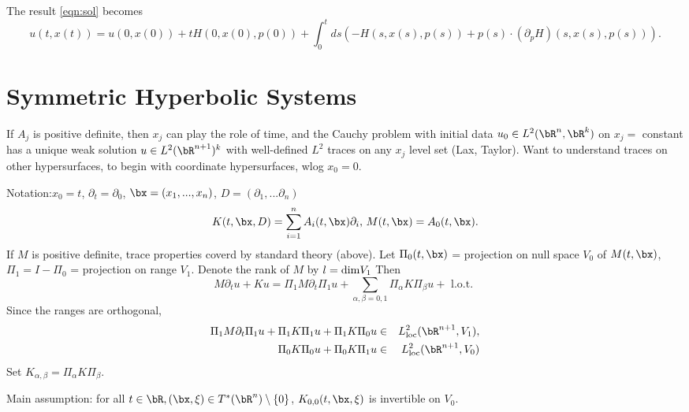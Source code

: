 The result \ref{eqn:sol} becomes
\begin{equation}
  \label{eqn:hsol}
  u(t,x(t))=u(0,x(0)) +tH(0,x(0),p(0))+ \int_0^t ds (-H(s,x(s),p(s)) + p(s)\cdot (\partial_p H)(s,x(s),p(s))).
\end{equation}

\section{Symmetric Hyperbolic Systems}

If $A_j$ is positive definite, then $x_j$ can play the role of time, and the Cauchy problem with initial data $u_0 \in L^2(\bR^n,\bR^k)$  on $x_j=$ constant has a unique weak solution $u \in L^2(\bR^{n+1})^k$ with well-defined $L^2$ traces on any $x_j$ level set (Lax, Taylor). Want to understand traces on other hypersurfaces, to begin with coordinate hypersurfaces, wlog $x_0=0$.

Notation:$x_0=t$, $\partial_t=\partial_0$, $\bx = (x_1,...,x_n)$, $D=(\partial_1,...\partial_n)$
\[
  K(t,\bx,D)= \sum_{i=1}^n A_i(t,\bx)\partial_i, \, M(t,\bx) = A_0(t,\bx).
\]
If $M$ is positive definite, trace properties coverd by standard theory (above). Let $\Pi_0(t,\bx)$ = projection on null space $V_0$ of $M(t,\bx)$, $\Pi_1=I-\Pi_0$ = projection on range $V_1$. Denote the rank of $M$ by $l={\rm dim} V_1$ Then
\[
  M\partial_t u + Ku = \Pi_1 M \partial_t \Pi_1 u + \sum_{\alpha,\beta=0,1} \Pi_{\alpha}K\Pi_{\beta}u + \mbox{ l.o.t. }
\]
Since the ranges are orthogonal,
\begin{eqnarray}
  \Pi_1 M \partial_t \Pi_1 u + \Pi_1 K \Pi_1 u + \Pi_1 K \Pi_0 u & \in & L^2_{\rm loc}(\bR^{n+1},V_1),
  \label{eqn:decomp1} \\
  \Pi_0 K \Pi_0 u + \Pi_0 K \Pi_1 u & \in & L^2_{\rm loc}(\bR^{n+1},V_0)
  \label{eqn:decomp0}
\end{eqnarray}
Set $K_{\alpha,\beta} = \Pi_{\alpha}K\Pi_{\beta}$.

Main assumption: for all $t \in \bR, (\bx,\xi) \in T^*(\bR^n)\setminus \{0\}$, $K_{0,0}(t,\bx,\xi)$ is invertible on $V_0$.


